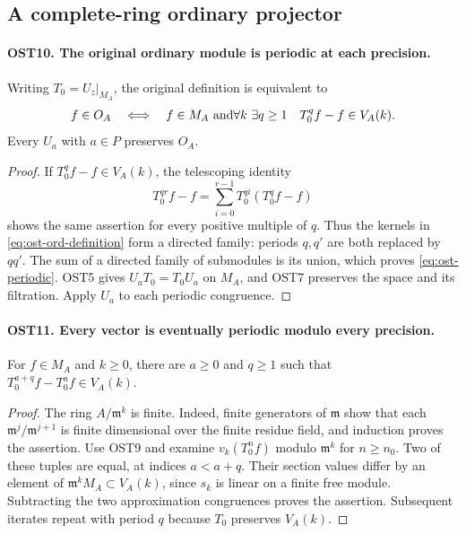\subsection{A complete-ring ordinary projector}

\paragraph{OST10. The original ordinary module is periodic at each precision.}
\label{claim:OST10}
Writing $T_0=U_z|_{M_A}$, the original definition is equivalent to
\begin{equation}\label{eq:ost-periodic}
 f\in O_A\quad\Longleftrightarrow\quad
 f\in M_A\ \hbox{and}
 \forall k\ \exists q\geq1\quad T_0^qf-f\in V_A(k).
\end{equation}
Every $U_a$ with $a\in P$ preserves $O_A$.
\begin{proof}
If $T_0^qf-f\in V_A(k)$, the telescoping identity
\[
 T_0^{qr}f-f=\sum_{i=0}^{r-1}T_0^{qi}(T_0^qf-f)
\]
shows the same assertion for every positive multiple of $q$.
Thus the kernels in \eqref{eq:ost-ord-definition} form a
directed family: periods $q,q'$ are both replaced by $qq'$.
The sum of a directed family of submodules is its union,
which proves \eqref{eq:ost-periodic}.  OST5 gives
$U_aT_0=T_0U_a$ on $M_A$, and OST7 preserves the space and
its filtration.  Apply $U_a$ to each periodic congruence.
\end{proof}

\paragraph{OST11. Every vector is eventually periodic modulo every precision.}
\label{claim:OST11}
For $f\in M_A$ and $k\geq0$, there are $a\geq0$ and $q\geq1$
such that $T_0^{a+q}f-T_0^af\in V_A(k)$.
\begin{proof}
The ring $A/\mathfrak m^k$ is finite.  Indeed, finite generators
of $\mathfrak m$ show that each
$\mathfrak m^j/\mathfrak m^{j+1}$ is finite dimensional over
the finite residue field, and induction proves the assertion.
Use OST9 and examine $v_k(T_0^nf)$ modulo $\mathfrak m^k$
for $n\geq n_0$.  Two of these tuples are equal, at indices
$a<a+q$.  Their section values differ by an element of
$\mathfrak m^kM_A\subset V_A(k)$, since $s_k$ is linear
on a finite free module.  Subtracting the two approximation
congruences proves the assertion.  Subsequent iterates repeat
with period $q$ because $T_0$ preserves $V_A(k)$.
\end{proof}


